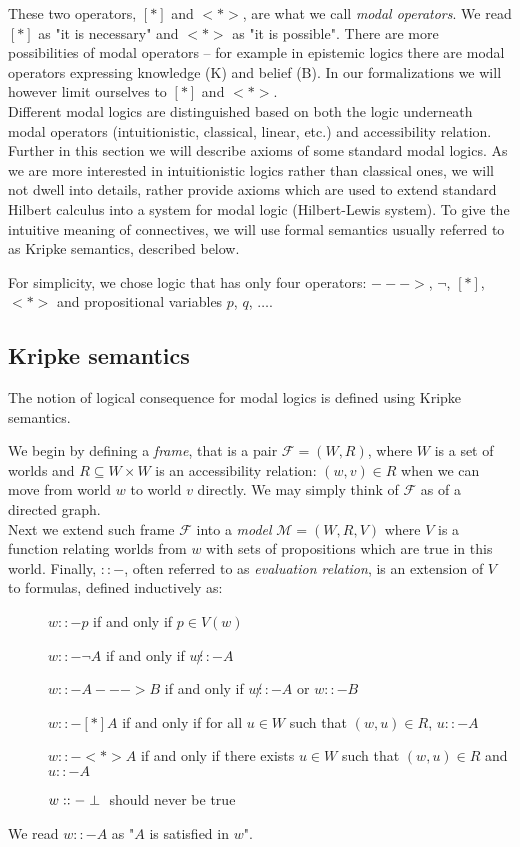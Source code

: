 These two operators, $[*]$ and $<*>$, are what we call \emph{modal operators}. We read $[*]$ as "it is necessary" and $<*>$ as "it is possible". There are more possibilities of modal operators -- for example in epistemic logics there are modal operators expressing knowledge (K) and belief (B). In our formalizations we will however limit ourselves to $[*]$ and $<*>$.\\

Different modal logics are distinguished based on both the logic underneath modal operators (intuitionistic, classical, linear, etc.) and accessibility relation. Further in this section we will describe axioms of some standard modal logics. As we are more interested in intuitionistic logics rather than classical ones, we will not dwell into details, rather provide axioms which are used to extend standard Hilbert calculus into a system for modal logic (Hilbert-Lewis system). To give the intuitive meaning of connectives, we will use formal semantics usually referred to as Kripke semantics, described below.

For simplicity, we chose logic that has only four operators: $--->$, $\neg$, $[*]$, $<*>$ and propositional variables $p$, $q$, $\dots$.

\subsection{Kripke semantics}
The notion of logical consequence for modal logics is defined using Kripke semantics.

We begin by defining a \emph{frame}, that is a pair $\mathcal F = (W, R)$, where $W$ is a set of worlds and $R \subseteq W \times W$ is an accessibility relation: $(w, v) \in R$ when we can move from world $w$ to world $v$ directly. We may simply think of $\mathcal F$ as of a directed graph.\\
Next we extend such frame $\mathcal F$ into a \emph{model} $\mathcal M = (W, R , V)$ where $V$ is a function relating worlds from $w$ with sets of propositions which are true in this world. Finally, $::-$, often referred to as \emph{evaluation relation}, is an extension of $V$ to formulas, defined inductively as:
\begin{description}
\item[] $w ::- p$ if and only if $p \in V (w)$
\item[] $w ::- \neg A$ if and only if $w \not ::- A$
\item[]$w ::- A ---> B$ if and only if $w \not ::- A$ or $w ::- B$
\item[]$w ::- [*]A$ if and only if for all ${u\in W}$ such that  $(w, u) \in R$, $u ::- A$
\item[]$w ::- <*>A$ if and only if there exists $u \in W$ such that $(w, u) \in R $ and $u ::- A$
\item[]$w ::- \perp{}$ should never be true
\end{description}
We read $w ::- A$ as "$A$ is satisfied in $w$".\\ 

